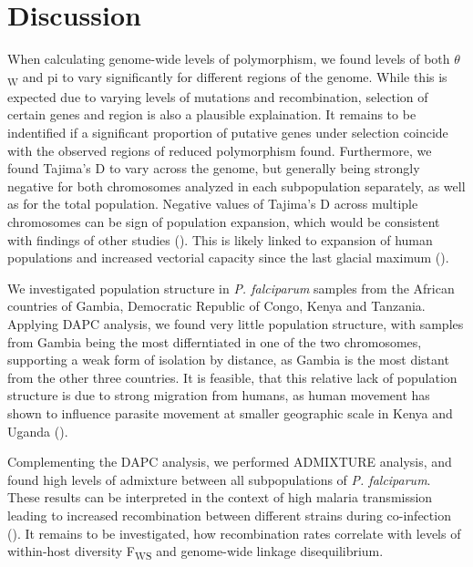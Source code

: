 \documentclass[11pt]{article}
\begin{document}
\section*{Discussion}
\label{sec:org66bb4f3}
When calculating genome-wide levels of polymorphism, we found levels of both \(\theta\)\textsubscript{W} and pi to vary significantly for different regions of the genome. While this is expected due to varying levels of mutations and recombination, selection of certain genes and region is also a plausible explaination. It remains to be indentified if a significant proportion of putative genes under selection coincide with the observed regions of reduced polymorphism found. Furthermore, we found Tajima's D to vary across the genome, but generally being strongly negative for both chromosomes analyzed in each subpopulation separately, as well as for the total population. Negative values of Tajima's D across multiple chromosomes can be sign of population expansion, which would be consistent with findings of other studies (\cite{rich-2000-popul-struc}). This is likely linked to expansion of human populations and increased vectorial capacity since the last glacial maximum (\cite{donnelly-2001-eviden-recen}).

We investigated population structure in \emph{P. falciparum} samples from the African countries of Gambia, Democratic Republic of Congo, Kenya and Tanzania. Applying DAPC analysis, we found very little population structure, with samples from Gambia being the most differntiated in one of the two chromosomes, supporting a weak form of isolation by  distance, as Gambia is the most distant from the other three countries. It is feasible, that this relative lack of population structure is due to strong migration from humans, as human movement has shown to influence parasite movement at smaller geographic scale in Kenya and Uganda (\cite{nderu-2019-genet-diver}).

Complementing the DAPC analysis, we performed ADMIXTURE analysis, and found high levels of admixture between all subpopulations of \emph{P. falciparum}. These results can be interpreted in the context of high malaria transmission leading to increased recombination between different strains during co-infection (\cite{anderson-2000-micros-marker}). It remains to be investigated, how recombination rates correlate with levels of within-host diversity F\textsubscript{WS} and genome-wide linkage disequilibrium.
\end{document}
